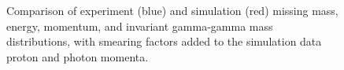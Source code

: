 \begin{figure}[hbt]
	\caption{Comparison of experiment (blue) and simulation (red) missing mass, energy, momentum, and invariant gamma-gamma mass distributions, with smearing factors added to the simulation data proton and photon momenta.}
	\label{fig:good}
\end{figure}